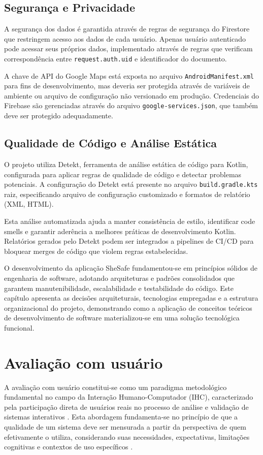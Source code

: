 \subsection{Segurança e Privacidade}
A segurança dos dados é garantida através de regras de segurança do Firestore que restringem acesso aos dados de cada usuário. Apenas usuário autenticado pode acessar seus próprios dados, implementado através de regras que verificam correspondência entre \texttt{request.auth.uid} e identificador do documento.

A chave de API do Google Maps está exposta no arquivo \texttt{AndroidManifest.xml} para fins de desenvolvimento, mas deveria ser protegida através de variáveis de ambiente ou arquivo de configuração não versionado em produção. Credenciais do Firebase são gerenciadas através do arquivo \texttt{google-services.json}, que também deve ser protegido adequadamente.

\subsection{Qualidade de Código e Análise Estática}
O projeto utiliza Detekt, ferramenta de análise estática de código para Kotlin, configurada para aplicar regras de qualidade de código e detectar problemas potenciais. A configuração do Detekt está presente no arquivo \texttt{build.gradle.kts} raiz, especificando arquivo de configuração customizado e formatos de relatório (XML, HTML).

Esta análise automatizada ajuda a manter consistência de estilo, identificar code smells e garantir aderência a melhores práticas de desenvolvimento Kotlin. Relatórios gerados pelo Detekt podem ser integrados a pipelines de CI/CD para bloquear merges de código que violem regras estabelecidas.

O desenvolvimento da aplicação SheSafe fundamentou-se em princípios sólidos de engenharia de software, adotando arquiteturas e padrões consolidados que garantem manutenibilidade, escalabilidade e testabilidade do código. Este capítulo apresenta as decisões arquiteturais, tecnologias empregadas e a estrutura organizacional do projeto, demonstrando como a aplicação de conceitos teóricos de desenvolvimento de software materializou-se em uma solução tecnológica funcional.

\section{Avaliação com usuário}
A avaliação com usuário constitui-se como um paradigma metodológico fundamental no campo da Interação Humano-Computador (IHC), caracterizado pela participação direta de usuários reais no processo de análise e validação de sistemas interativos \cite{dix2003human}. Esta abordagem fundamenta-se no princípio de que a qualidade de um sistema deve ser mensurada a partir da perspectiva de quem efetivamente o utiliza, considerando suas necessidades, expectativas, limitações cognitivas e contextos de uso específicos \cite{preece2015interaction}.

